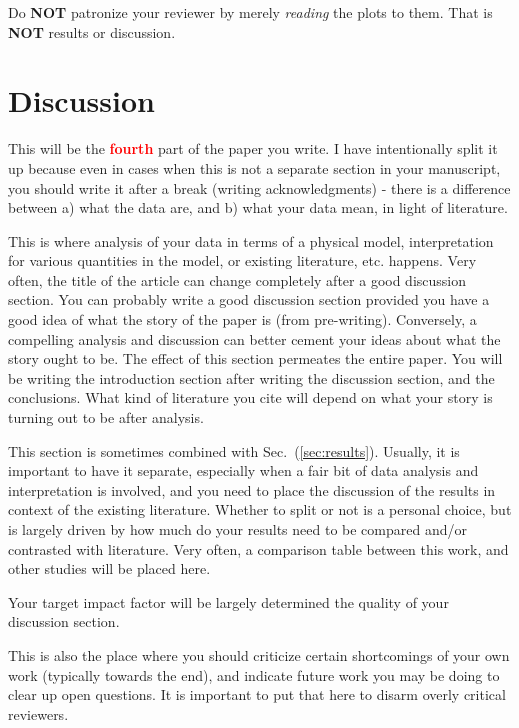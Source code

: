 \documentclass[12 pt]{article}
\begin{document}
Do \textbf{NOT} patronize your reviewer by merely \textit{reading} the plots to them. That is \textbf{NOT} results or discussion.

\section{Discussion}
\label{sec:discussion}

This will be the \textbf{\Huge \textcolor{red}{fourth}} part of the paper you write. I have intentionally split it up because even in cases when this is not a separate section in your manuscript, you should write it after a break (writing acknowledgments) - there is a difference between a) what the data are, and b) what your data mean, in light of literature.

This is where analysis of your data in terms of a physical model, interpretation for various quantities in the model, or existing literature, etc. happens. Very often, the title of the article can change completely after a good discussion section. You can probably write a good discussion section provided you have a good idea of what the story of the paper is (from pre-writing). Conversely, a compelling analysis and discussion can better cement your ideas about what the story ought to be. The effect of this section permeates the entire paper. You will be writing the introduction section after writing the discussion section, and the conclusions. What kind of literature you cite will depend on what your story is turning out to be after analysis.

This section is sometimes combined with Sec.~(\ref{sec:results}). Usually, it is important to have it separate, especially when a fair bit of data analysis and interpretation is involved, and you need to place the discussion of the results in context of the existing literature. Whether to split or not is a personal choice, but is largely driven by how much do your results need to be compared and/or contrasted with literature. Very often, a comparison table between this work, and other studies will be placed here.

Your target impact factor will be largely determined the quality of your discussion section.

This is also the place where you should criticize certain shortcomings of your own work (typically towards the end), and indicate future work you may be doing to clear up open questions. It is important to put that here to disarm overly critical reviewers.
\end{document}
